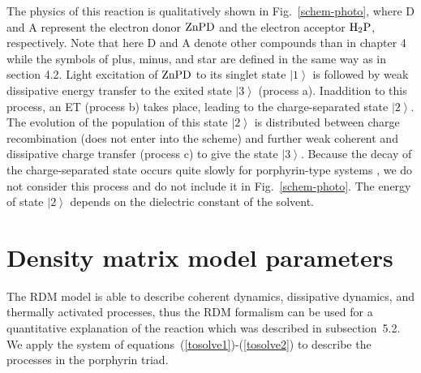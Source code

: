 \documentclass[12pt,twoside,a4paper]{report}
\begin{document}
The physics of this reaction is qualitatively shown in
Fig.~\ref{schem-photo}, where D and A represent 
the electron donor {${\rm ZnPD}$ and 
the electron acceptor ${\rm H_2P}$}, 
respectively. 
Note that here D and A denote other compounds than in chapter 4
while the symbols of plus, minus, and star
are defined in the same way as in section 4.2.
 Light excitation of 
${\rm ZnPD}$ to its singlet state $\left| 1\right\rangle  $ 
is followed by weak dissipative energy transfer 
to the 
exited 
state $\left| 3\right\rangle$ (process a).
Inaddition to this process,
an ET (process b) takes place, leading to the 
charge-separated state $\left| 2\right\rangle $. 
The evolution of the population of this state 
$\left| 2\right\rangle $ 
is distributed between {charge recombination 
(does not enter into the scheme) 
and further weak coherent and dissipative charge transfer 
(process c) to give the state }$\left| 3\right\rangle $. Because the decay 
of the {charge-separated state occurs quite slowly
for porphyrin-type systems \cite{fras94}, we do not consider this 
process and do not include it in} Fig.~\ref{schem-photo}. 
The energy of state $\left| 2\right\rangle $ depends on the dielectric 
constant of the solvent.
 
\section{Density matrix model parameters} \label{RDM-param}
The RDM model is able to describe coherent dynamics, dissipative dynamics, 
and thermally activated processes, 
thus the RDM formalism can be used for 
a quantitative explanation of the reaction which was described in
subsection~5.2.
We apply the system of equations~(\ref{tosolve1})-(\ref{tosolve2})
to describe the processes in the porphyrin triad.
% 
\end{document}
